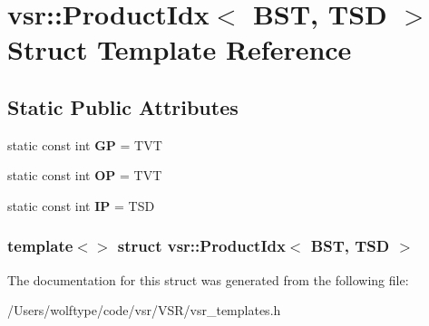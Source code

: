 \hypertarget{structvsr_1_1_product_idx_3_01_b_s_t_00_01_t_s_d_01_4}{\section{vsr\-:\-:Product\-Idx$<$ B\-S\-T, T\-S\-D $>$ Struct Template Reference}
\label{structvsr_1_1_product_idx_3_01_b_s_t_00_01_t_s_d_01_4}
}
\subsection*{Static Public Attributes}
\begin{DoxyCompactItemize}
\item 
\hypertarget{structvsr_1_1_product_idx_3_01_b_s_t_00_01_t_s_d_01_4_aeabfb9e2c39779afb7b36d9c04bcbd3c}{static const int {\bfseries G\-P} = T\-V\-T}\label{structvsr_1_1_product_idx_3_01_b_s_t_00_01_t_s_d_01_4_aeabfb9e2c39779afb7b36d9c04bcbd3c}

\item 
\hypertarget{structvsr_1_1_product_idx_3_01_b_s_t_00_01_t_s_d_01_4_a28db7a45e0ce1e6a441a92d35ce8eafb}{static const int {\bfseries O\-P} = T\-V\-T}\label{structvsr_1_1_product_idx_3_01_b_s_t_00_01_t_s_d_01_4_a28db7a45e0ce1e6a441a92d35ce8eafb}

\item 
\hypertarget{structvsr_1_1_product_idx_3_01_b_s_t_00_01_t_s_d_01_4_a511aad32420bba2be388bd4d6b59abf9}{static const int {\bfseries I\-P} = T\-S\-D}\label{structvsr_1_1_product_idx_3_01_b_s_t_00_01_t_s_d_01_4_a511aad32420bba2be388bd4d6b59abf9}

\end{DoxyCompactItemize}
\subsubsection*{template$<$$>$ struct vsr\-::\-Product\-Idx$<$ B\-S\-T, T\-S\-D $>$}



The documentation for this struct was generated from the following file\-:\begin{DoxyCompactItemize}
\item 
/\-Users/wolftype/code/vsr/\-V\-S\-R/vsr\-\_\-templates.\-h\end{DoxyCompactItemize}
